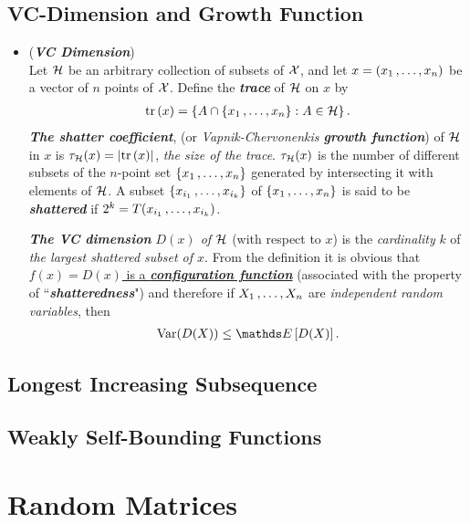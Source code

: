 \documentclass[11pt]{article}
\begin{document}
\subsection{VC-Dimension and Growth Function}
\begin{itemize}
\item \begin{example} (\emph{\textbf{VC Dimension}})\\
Let ${\mathcal H}$ be an arbitrary collection of subsets of ${\mathcal X}$, and let $x = (x_1 \,{,}\ldots{,}\, x_n)$ be a vector of $n$ points of ${\mathcal X}$. Define the \emph{\textbf{trace}} of ${\mathcal H}$ on $x$ by
\begin{align*}
\mathrm{tr}\left(x \right) = \left\{A \cap \left\{x_1 \,{,}\ldots{,}\, x_n\right\}: A \in {\mathcal H}\right\}.
\end{align*}
\emph{\textbf{The shatter coefficient}}, (or \emph{Vapnik-Chervonenkis \textbf{growth function}}) of ${\mathcal H}$ in $x$ is $\tau_{{\mathcal H}}(x) = \left\lvert \mathrm{tr}\left(x \right) \right\rvert$, \emph{the size of the trace}. $\tau_{{\mathcal H}}(x)$ is the number of different subsets of the $n$-point set $\left\{x_1 \,{,}\ldots{,}\, x_n\right\}$ generated by intersecting it with elements of ${\mathcal H}$. A subset
$\left\{x_{i_1} \,{,}\ldots{,}\, x_{i_k}\right\}$ of $\left\{x_1 \,{,}\ldots{,}\, x_n\right\}$ is said to be \emph{\textbf{shattered}} if $2^k = T(x_{i_1} \,{,}\ldots{,}\, x_{i_k})$. 

\emph{\textbf{The VC dimension} $D(x)$ of ${\mathcal H}$} (with respect to $x$) is the \emph{cardinality} $k$ of \emph{the largest shattered subset of $x$}. From the definition it is obvious that \underline{$f(x) = D(x)$ is a \emph{\textbf{configuration function}}} (associated with the property of ``\emph{\textbf{shatteredness}}") and therefore if $X_1 \,{,}\ldots{,}\, X_n$ are \emph{independent random variables}, then
\begin{align*}
\text{Var}(D(X)) \le \E{}{D(X)}.
\end{align*}
\end{example}
\end{itemize}
\subsection{Longest Increasing Subsequence}
\subsection{Weakly Self-Bounding Functions}


\section{Random Matrices}
\end{document}
